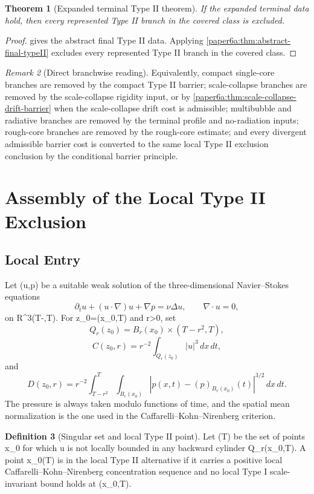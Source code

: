 \documentclass[11pt]{amsart}
\def\({}%
\def\){}%
\def\mathbb#1{#1}%
\theoremstyle{plain}
\newtheorem{theorem}{Theorem}[section]
\theoremstyle{definition}
\newtheorem{definition}[theorem]{Definition}
\theoremstyle{remark}
\newtheorem{remark}[theorem]{Remark}
\begin{document}
\begin{theorem}[Expanded terminal Type II theorem]
\label{paper6a:thm:expanded-terminal-typeII}
If the expanded terminal data hold, then every represented Type II branch in
the covered class is excluded.
\end{theorem}

\begin{proof}
 gives the abstract final Type II data.
Applying \cref{paper6a:thm:abstract-final-typeII} excludes every represented
Type II branch in the covered class.
\end{proof}

\begin{remark}[Direct branchwise reading]
Equivalently, compact single-core branches are removed by the compact Type II
barrier; scale-collapse branches are removed by the scale-collapse rigidity
input, or by \cref{paper6a:thm:scale-collapse-drift-barrier} when the
scale-collapse drift cost is admissible; multibubble and radiative branches
are removed by the terminal profile and no-radiation inputs; rough-core
branches are removed by the rough-core estimate; and every divergent admissible
barrier cost is converted to the same local Type II exclusion conclusion by
the conditional barrier principle.
\end{remark}

\clearpage
\section{Assembly of the Local Type II Exclusion}\label{sec:typeII-assembly}
\subsection{Local Entry}

Let \((u,p)\) be a suitable weak solution of the three-dimensional
Navier--Stokes equations
\[
  \partial_tu+(u\cdot\nabla)u+\nabla p=\nu\Delta u,
  \qquad \nabla\cdot u=0,
\]
on \(\mathbb R^3\times(T-\delta,T)\).  For \(z_0=(x_0,T)\) and \(r>0\), set
\[
  Q_r(z_0)=B_r(x_0)\times(T-r^2,T),
\]
\[
  C(z_0,r)=r^{-2}\int_{Q_r(z_0)}|u|^3\,dx\,dt,
\]
and
\[
  D(z_0,r)=r^{-2}\int_{T-r^2}^{T}\int_{B_r(x_0)}
  |p(x,t)-(p)_{B_r(x_0)}(t)|^{3/2}\,dx\,dt.
\]
The pressure is always taken modulo functions of time, and the spatial mean
normalization is the one used in the Caffarelli--Kohn--Nirenberg criterion.

\begin{definition}[Singular set and local Type II point]
Let \(\Sigma(T)\) be the set of points \(x_0\) for which \(u\) is not locally
bounded in any backward cylinder \(Q_r(x_0,T)\).  A point \(x_0\in\Sigma(T)\)
is in the local Type II alternative if it carries a positive local
Caffarelli--Kohn--Nirenberg concentration sequence and no local Type I
scale-invariant bound holds at \((x_0,T)\).
\end{definition}
\end{document}
